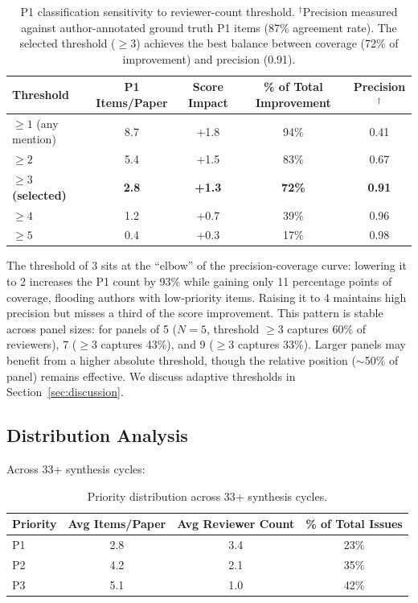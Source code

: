 \begin{table}[h]
\centering
\small
\begin{tabular}{lcccc}
\toprule
Threshold & P1 Items/Paper & Score Impact & \% of Total Improvement & Precision$^\dagger$ \\
\midrule
$\geq 1$ (any mention) & 8.7 & +1.8 & 94\% & 0.41 \\
$\geq 2$ & 5.4 & +1.5 & 83\% & 0.67 \\
\textbf{$\geq 3$ (selected)} & \textbf{2.8} & \textbf{+1.3} & \textbf{72\%} & \textbf{0.91} \\
$\geq 4$ & 1.2 & +0.7 & 39\% & 0.96 \\
$\geq 5$ & 0.4 & +0.3 & 17\% & 0.98 \\
\bottomrule
\end{tabular}
\caption{P1 classification sensitivity to reviewer-count threshold. $^\dagger$Precision measured against author-annotated ground truth P1 items (87\% agreement rate). The selected threshold ($\geq 3$) achieves the best balance between coverage (72\% of improvement) and precision (0.91).}
\label{tab:threshold-sensitivity}
\end{table}

The threshold of 3 sits at the ``elbow'' of the precision-coverage curve: lowering it to 2 increases the P1 count by 93\% while gaining only 11 percentage points of coverage, flooding authors with low-priority items. Raising it to 4 maintains high precision but misses a third of the score improvement. This pattern is stable across panel sizes: for panels of 5 ($N{=}5$, threshold $\geq 3$ captures 60\% of reviewers), 7 ($\geq 3$ captures 43\%), and 9 ($\geq 3$ captures 33\%). Larger panels may benefit from a higher absolute threshold, though the relative position ($\sim$50\% of panel) remains effective. We discuss adaptive thresholds in Section~\ref{sec:discussion}.

\subsection{Distribution Analysis}

Across 33+ synthesis cycles:

\begin{table}[h]
\centering
\begin{tabular}{lccc}
\toprule
Priority & Avg Items/Paper & Avg Reviewer Count & \% of Total Issues \\
\midrule
P1 & 2.8 & 3.4 & 23\% \\
P2 & 4.2 & 2.1 & 35\% \\
P3 & 5.1 & 1.0 & 42\% \\
\bottomrule
\end{tabular}
\caption{Priority distribution across 33+ synthesis cycles.}
\end{table}

